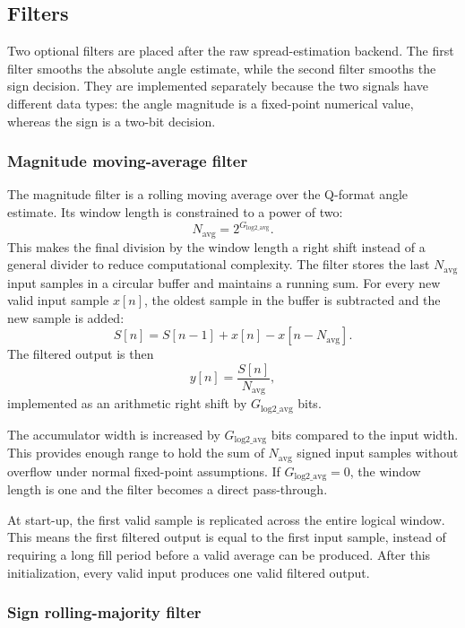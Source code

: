 \subsection{Filters}
\label{subsec:spread-estimation-filters}

Two optional filters are placed after the raw spread-estimation backend. The first filter smooths the absolute angle estimate, while the second filter smooths the sign decision. They are implemented separately because the two signals have different data types: the angle magnitude is a fixed-point numerical value, whereas the sign is a two-bit decision.

\subsubsection{Magnitude moving-average filter}

The magnitude filter is a rolling moving average over the Q-format angle estimate. Its window length is constrained to a power of two:
\[
    N_{\mathrm{avg}} = 2^{G_{\mathrm{log2\_avg}}}.
\]
This makes the final division by the window length a right shift instead of a general divider to reduce computational complexity. The filter stores the last \(N_{\mathrm{avg}}\) input samples in a circular buffer and maintains a running sum. For every new valid input sample \(x[n]\), the oldest sample in the buffer is subtracted and the new sample is added:
\[
    S[n] = S[n-1] + x[n] - x[n-N_{\mathrm{avg}}].
\]
The filtered output is then
\[
    y[n] = \frac{S[n]}{N_{\mathrm{avg}}},
\]
implemented as an arithmetic right shift by \(G_{\mathrm{log2\_avg}}\) bits.

The accumulator width is increased by \(G_{\mathrm{log2\_avg}}\) bits compared to the input width. This provides enough range to hold the sum of \(N_{\mathrm{avg}}\) signed input samples without overflow under normal fixed-point assumptions. If \(G_{\mathrm{log2\_avg}}=0\), the window length is one and the filter becomes a direct pass-through.

At start-up, the first valid sample is replicated across the entire logical window. This means the first filtered output is equal to the first input sample, instead of requiring a long fill period before a valid average can be produced. After this initialization, every valid input produces one valid filtered output.

\subsubsection{Sign rolling-majority filter}

